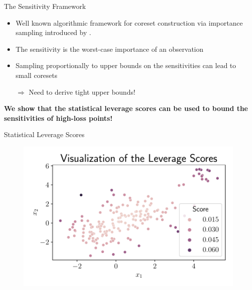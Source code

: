 \documentclass[gray]{beamer}
\begin{document}
\begin{frame}{The Sensitivity Framework}\pause

    \begin{itemize}
        \item Well known algorithmic framework for coreset construction via
              importance sampling introduced by \cite{feldman-langberg-coresets}.
        \item The sensitivity is the worst-case importance of an observation
        \item Sampling proportionally to upper bounds on the sensitivities
              can lead to small coresets
        \item[$\Rightarrow$] Need to derive tight upper bounds!
    \end{itemize}

    \pause

    \vspace{\fill}

    \textbf{We show that the statistical leverage scores can be
        used to bound the sensitivities of high-loss points!}

\end{frame}

\begin{frame}{Statistical Leverage Scores}
    \begin{figure}[ht!]
        \centering
        \includegraphics[width=\linewidth]{../figures/leverage_scores_visualization.pdf}
    \end{figure}
\end{frame}
\end{document}
